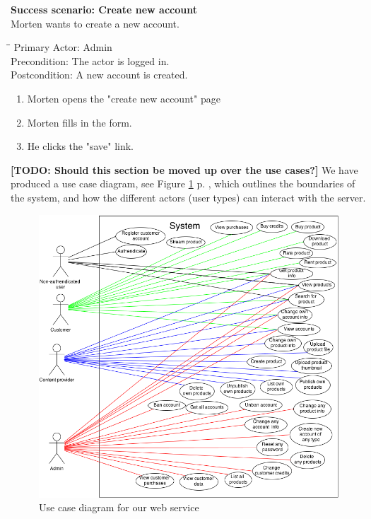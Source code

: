 \textbf{Success scenario: Create new account} \\
Morten wants to create a new account.
\begin{tabbing}
\hspace{5mm}\=\hspace{26mm}\=\kill
\>Primary Actor:\> Admin\\
\>Precondition:\> The actor is logged in.\\
\>Postcondition:\> A new account is created.
\end{tabbing}
\begin{enumerate} \setlength{\itemsep}{-1mm}
	\item Morten opens the "create new account" page
	\item Morten fills in the form.
	\item He clicks the "save" link.
\end{enumerate}

\textbf{[TODO: Should this section be moved up over the use cases?]}
We have produced a use case diagram, see Figure \ref{useCaseImg} p. \pageref{useCaseImg}, which outlines the boundaries of the system, and how the different actors (user types) can interact with the server. 
\begin{figure}[h]
\centering
\includegraphics[scale=0.5]{illustrations/UseCaseDiagram.png}
\caption{Use case diagram for our web service}
\label{useCaseImg}
\end{figure}